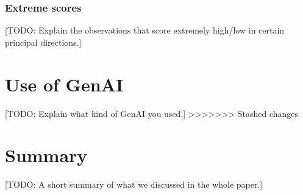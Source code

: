 \documentclass[dtu]{dtuarticle}
\newcommand{\todo}[1]{\color{red}[TODO: #1]\color{black}}
\begin{document}
	\subsubsection{Extreme scores}

	\todo{Explain the observations that score extremely high/low in certain principal directions.}

	\section{Use of GenAI}

	\todo{Explain what kind of GenAI you used.}
>>>>>>> Stashed changes

	\section*{Summary}

	\todo{A short summary of what we discussed in the whole paper.}

	
	
\end{document}
